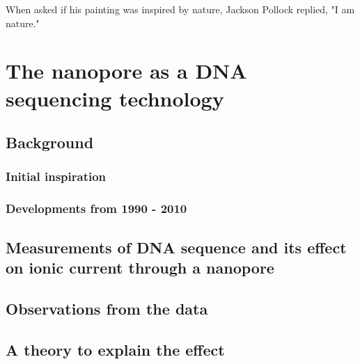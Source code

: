 \begin{savequote}[75mm]
When asked if his painting was inspired by nature, Jackson Pollock replied, "I am nature."
\end{savequote}

\chapter{The nanopore as a DNA sequencing technology}
\label{dna_sequencing}

\section{Background}

\subsection{Initial inspiration}

\subsection{Developments from 1990 - 2010}

\section{Measurements of DNA sequence and its effect on ionic current through a nanopore}

\section{Observations from the data}

\section{A theory to explain the effect}
